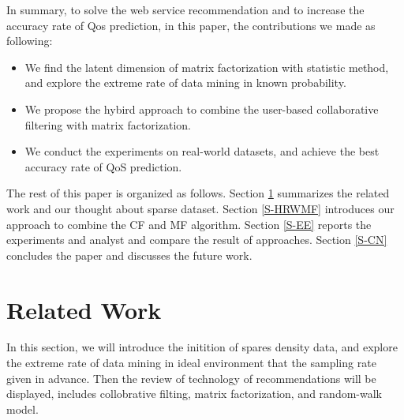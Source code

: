 \documentclass[conference]{IEEEtran}
\begin{document}
\par  In summary, to solve the web service recommendation and to increase the accuracy rate of Qos prediction, in this paper, the contributions we made as following:
\begin{itemize}
\item We find the latent dimension of matrix factorization with statistic method, and explore the extreme rate of data mining in known probability.
\item We propose the hybird approach to combine the user-based collaborative filtering with matrix factorization.
\item We conduct the experiments on real-world datasets, and achieve the best accuracy rate of QoS prediction.
\end{itemize}

\par The rest of this paper is organized as follows. Section \ref{S-RW} summarizes the related work and our thought about sparse dataset. Section \ref{S-HRWMF} introduces our approach to combine the CF and MF algorithm. Section \ref{S-EE} reports the experiments and analyst and compare the result of approaches. Section \ref{S-CN} concludes the paper and discusses the future work. 


\section{Related Work}\label{S-RW}
In this section, we will introduce the initition of spares density data, and explore the extreme rate of data mining in ideal environment that the sampling rate given in advance. Then the review of technology of recommendations will be displayed, includes collobrative filting, matrix factorization, and random-walk model.
\end{document}
